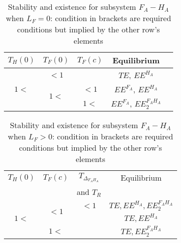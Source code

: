 \documentclass{article}
\begin{document}
\begin{table}[!ht]
\centering
\caption{\centering Stability and existence for subsystem $F_A-H_A$ when $L_F = 0$: condition in brackets are required conditions but implied by the other row's elements}
\begin{tabular}{c|c|c|c|c}
$T_H(0)$ & $T_F(0)$  & $T_F(c)$ & Equilibrium \\
\hline
\multirow{3}{*}{$1<$} & $<1$ & &  $TE$, $EE^{H_A}$ \\
\cline{2-4}
 &  \multirow{2}{*}{$1<$}  & $<1$&  $EE^{F_A}$, $EE^{H_A}$ \\
 & & $1<$ & $EE^{F_A}$, $EE^{F_AH_A}_2$ \\
\hline
\end{tabular}
\end{table}
%

\begin{table}[!ht]
\centering
\caption{\centering Stability and existence for subsystem $F_A-H_A$ when $L_F > 0$: condition in brackets are required conditions but implied by the other row's elements}
\begin{tabular}{c|c|c|c}
$T_H(0)$ & $T_F(c)$ & $T_{\Delta_{F_AH_A}}$  & Equilibrium \\
 & & and $T_R$ &  \\
\hline
\multirow{3}{*}{$1<$} & \multirow{2}{*}{$<1$} &$<1$& $TE, EE^{H_A}, EE^{F_AH_A}_2$ \\
 & & & $TE, EE^{H_A}$ \\
 \cline{2-4}
 &$1<$ & & $TE, EE^{F_AH_A}_2$ \\
\hline
\end{tabular}
\end{table}
\end{document}
